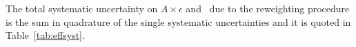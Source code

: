 


The total systematic uncertainty on $A \times \epsilon$ and \theRho\ due
to the reweighting procedure is the sum in quadrature of the single
systematic uncertainties and it is quoted in Table~\ref{tab:effsyst}. 


